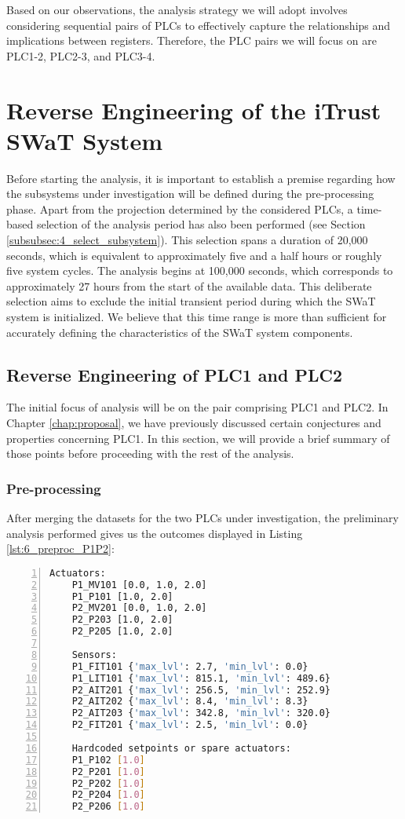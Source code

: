 \bigskip
Based on our observations, the analysis strategy we will adopt involves considering sequential pairs of PLCs to effectively capture the relationships and implications between registers. Therefore, the PLC pairs we will focus on are PLC1-2, PLC2-3, and PLC3-4. 

\section{Reverse Engineering of the iTrust SWaT System}
\label{sec:6_reverse_SWaT}
Before starting the analysis, it is important to establish a premise regarding how the subsystems under investigation will be defined during the pre-processing phase. Apart from the projection determined by the considered PLCs, a time-based selection of the analysis period has also been performed (see Section \ref{subsubsec:4_select_subsystem}). This selection spans a duration of 20,000 seconds, which is equivalent to approximately five and a half hours or roughly five system cycles. The analysis begins at 100,000 seconds, which corresponds to approximately 27 hours from the start of the available data. This deliberate selection aims to exclude the initial transient period during which the SWaT system is initialized. We believe that this time range is more than sufficient for accurately defining the characteristics of the SWaT system components.

\subsection{Reverse Engineering of PLC1 and PLC2}
\label{subsec:6_P1P2_analysis}
The initial focus of analysis will be on the pair comprising PLC1 and PLC2. In Chapter \ref{chap:proposal}, we have previously discussed certain conjectures and properties concerning PLC1. In this section, we will provide a brief summary of those points before proceeding with the rest of the analysis.

\subsubsection{Pre-processing}
\label{subsubsec:6_P1P2_preprocessing}
After merging the datasets for the two PLCs under investigation, the preliminary analysis performed gives us the outcomes displayed in Listing \ref{lst:6_preproc_P1P2}:

\begin{lstlisting}[language=bash, numbers=left, caption=Preliminary analysis outcomes for sensors and actuators of \texttt{PLC1-2}, label=lst:6_preproc_P1P2]
	Actuators: 
	P1_MV101 [0.0, 1.0, 2.0]
	P1_P101 [1.0, 2.0]
	P2_MV201 [0.0, 1.0, 2.0]
	P2_P203 [1.0, 2.0]
	P2_P205 [1.0, 2.0]
	
	Sensors: 
	P1_FIT101 {'max_lvl': 2.7, 'min_lvl': 0.0}
	P1_LIT101 {'max_lvl': 815.1, 'min_lvl': 489.6}
	P2_AIT201 {'max_lvl': 256.5, 'min_lvl': 252.9}
	P2_AIT202 {'max_lvl': 8.4, 'min_lvl': 8.3}
	P2_AIT203 {'max_lvl': 342.8, 'min_lvl': 320.0}
	P2_FIT201 {'max_lvl': 2.5, 'min_lvl': 0.0}
	
	Hardcoded setpoints or spare actuators: 
	P1_P102 [1.0]
	P2_P201 [1.0]
	P2_P202 [1.0]
	P2_P204 [1.0]
	P2_P206 [1.0]
\end{lstlisting}

